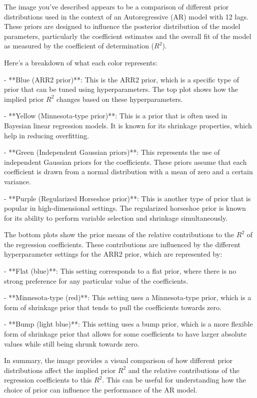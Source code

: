 The image you've described appears to be a comparison of different prior distributions used in the context of an Autoregressive (AR) model with 12 lags. These priors are designed to influence the posterior distribution of the model parameters, particularly the coefficient estimates and the overall fit of the model as measured by the coefficient of determination ($R^2$).

Here's a breakdown of what each color represents:

- **Blue (ARR2 prior)**: This is the ARR2 prior, which is a specific type of prior that can be tuned using hyperparameters. The top plot shows how the implied prior $R^2$ changes based on these hyperparameters.
  
- **Yellow (Minnesota-type prior)**: This is a prior that is often used in Bayesian linear regression models. It is known for its shrinkage properties, which help in reducing overfitting.

- **Green (Independent Gaussian priors)**: This represents the use of independent Gaussian priors for the coefficients. These priors assume that each coefficient is drawn from a normal distribution with a mean of zero and a certain variance.

- **Purple (Regularized Horseshoe prior)**: This is another type of prior that is popular in high-dimensional settings. The regularized horseshoe prior is known for its ability to perform variable selection and shrinkage simultaneously.

The bottom plots show the prior means of the relative contributions to the $R^2$ of the regression coefficients. These contributions are influenced by the different hyperparameter settings for the ARR2 prior, which are represented by:
  
- **Flat (blue)**: This setting corresponds to a flat prior, where there is no strong preference for any particular value of the coefficients.
  
- **Minnesota-type (red)**: This setting uses a Minnesota-type prior, which is a form of shrinkage prior that tends to pull the coefficients towards zero.
  
- **Bump (light blue)**: This setting uses a bump prior, which is a more flexible form of shrinkage prior that allows for some coefficients to have larger absolute values while still being shrunk towards zero.

In summary, the image provides a visual comparison of how different prior distributions affect the implied prior $R^2$ and the relative contributions of the regression coefficients to this $R^2$. This can be useful for understanding how the choice of prior can influence the performance of the AR model.
